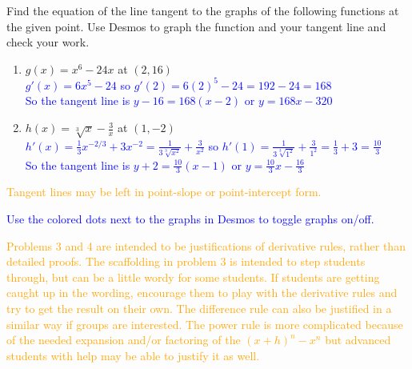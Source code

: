\documentclass{ximera}
\begin{document}
\begin{exercise}
    Find the equation of the line tangent to the graphs of the following functions at the given point.  Use Desmos to graph the function and your tangent line and check your work.
        \begin{enumerate}
            \item $g(x)=x^6-24x$ at $(2, 16)$\\
            \textcolor{blue}{ $g'(x)=6x^5-24$ so $g'(2)=6(2)^5-24=192-24=168$\\
            So the tangent line is $y-16=168(x-2)$ or $y=168x-320$}
            \item $h(x)=\sqrt[3]{x}-\frac{3}{x}$ at $(1, -2)$\\
            \textcolor{blue}{ $h'(x)=\frac{1}{3}x^{-2/3}+3x^{-2}=\frac{1}{3\sqrt[3]{x^2}}+\frac{3}{x^2}$ so $h'(1)=\frac{1}{3\sqrt[3]{1^2}}+\frac{3}{1^2}=\frac{1}{3}+3=\frac{10}{3}$\\
            So the tangent line is $y+2=\frac{10}{3}(x-1)$ or $y=\frac{10}{3}x-\frac{16}{3}$}
        \end{enumerate}
        \textcolor{orange}{Tangent lines may be left in point-slope or point-intercept form.}
        \begin{center}
        \end{center}
        \textcolor{blue}{Use the colored dots next to the graphs in Desmos to toggle graphs on/off.}
\end{exercise}

\textcolor{orange}{Problems 3 and 4 are intended to be justifications of derivative rules, rather than detailed proofs.  The scaffolding in problem 3 is intended to step students through, but can be a little wordy for some students.  If students are getting caught up in the wording, encourage them to play with the derivative rules and try to get the result on their own.  The difference rule can also be justified in a similar way if groups are interested.  The power rule is more complicated because of the needed expansion and/or factoring of the $(x+h)^n-x^n$ but advanced students with help may be able to justify it as well.}
\end{document}
